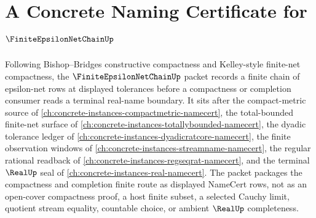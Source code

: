 \chapter{A Concrete Naming Certificate for $\FiniteEpsilonNetChainUp$}
\label{ch:concrete-instances-finite-epsilon-net-chain-namecert}

Following Bishop--Bridges constructive compactness and Kelley-style finite-net compactness, the $\FiniteEpsilonNetChainUp$ packet records a finite chain of epsilon-net rows at displayed tolerances before a compactness or completion consumer reads a terminal real-name boundary. It sits after the compact-metric source of \autoref{ch:concrete-instances-compactmetric-namecert}, the total-bounded finite-net surface of \autoref{ch:concrete-instances-totallybounded-namecert}, the dyadic tolerance ledger of \autoref{ch:concrete-instances-dyadicratcore-namecert}, the finite observation windows of \autoref{ch:concrete-instances-streamname-namecert}, the regular rational readback of \autoref{ch:concrete-instances-regseqrat-namecert}, and the terminal $\RealUp$ seal of \autoref{ch:concrete-instances-real-namecert}. The packet packages the compactness and completion finite route as displayed NameCert rows, not as an open-cover compactness proof, a host finite subset, a selected Cauchy limit, quotient stream equality, countable choice, or ambient $\RealUp$ completeness.

